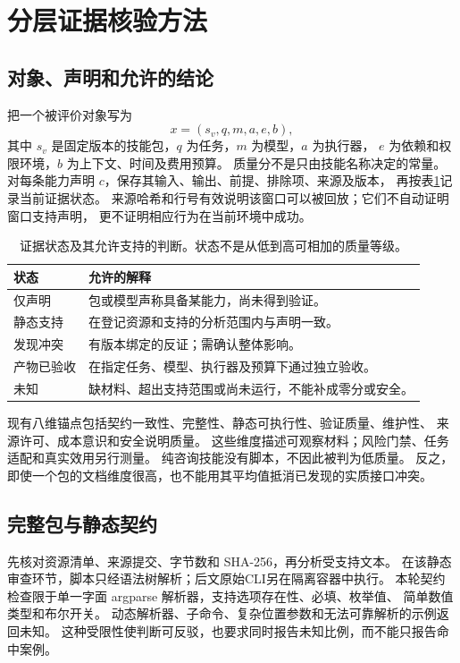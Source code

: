\section{分层证据核验方法}
\subsection{对象、声明和允许的结论}
把一个被评价对象写为
\begin{equation}
x=(s_v,q,m,a,e,b),
\end{equation}
其中 $s_v$ 是固定版本的技能包，$q$ 为任务，$m$ 为模型，$a$ 为执行器，
$e$ 为依赖和权限环境，$b$ 为上下文、时间及费用预算。
质量分不是只由技能名称决定的常量。
对每条能力声明 $c$，保存其输入、输出、前提、排除项、来源及版本，
再按表\ref{tab:states}记录当前证据状态。
来源哈希和行号有效说明该窗口可以被回放；它们不自动证明窗口支持声明，
更不证明相应行为在当前环境中成功。

\begin{table}[t]
\caption{证据状态及其允许支持的判断。状态不是从低到高可相加的质量等级。}
\label{tab:states}
\centering\small
\begin{tabularx}{\columnwidth}{p{}X}
\toprule
状态 & 允许的解释 \\
\midrule
仅声明 & 包或模型声称具备某能力，尚未得到验证。\\
静态支持 & 在登记资源和支持的分析范围内与声明一致。\\
发现冲突 & 有版本绑定的反证；需确认整体影响。\\
产物已验收 & 在指定任务、模型、执行器及预算下通过独立验收。\\
未知 & 缺材料、超出支持范围或尚未运行，不能补成零分或安全。\\
\bottomrule
\end{tabularx}
\end{table}

现有八维锚点包括契约一致性、完整性、静态可执行性、验证质量、维护性、
来源许可、成本意识和安全说明质量。
这些维度描述可观察材料；风险门禁、任务适配和真实效用另行测量。
纯咨询技能没有脚本，不因此被判为低质量。
反之，即使一个包的文档维度很高，也不能用其平均值抵消已发现的实质接口冲突。

\subsection{完整包与静态契约}
先核对资源清单、来源提交、字节数和 SHA-256，再分析受支持文本。
在该静态审查环节，脚本只经语法树解析；后文原始CLI另在隔离容器中执行。
本轮契约检查限于单一字面 argparse 解析器，支持选项存在性、必填、枚举值、
简单数值类型和布尔开关。
动态解析器、子命令、复杂位置参数和无法可靠解析的示例返回未知。
这种受限性使判断可反驳，也要求同时报告未知比例，而不能只报告命中案例。

